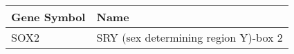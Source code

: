 \begin{tabular}{ll}
\toprule
Gene Symbol &                                 Name \\
\midrule
       SOX2 & SRY (sex determining region Y)-box 2 \\
\bottomrule
\end{tabular}

